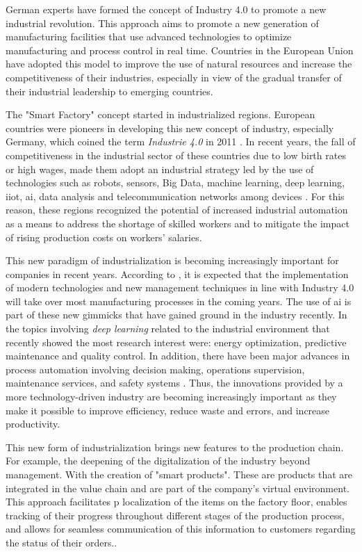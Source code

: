 German experts have formed the concept of Industry 4.0 to promote a new industrial revolution\cite{Grabowska+2020+90+96}. This approach aims to promote a new generation of manufacturing facilities that use advanced technologies to optimize manufacturing and process control in real time. Countries in the European Union have adopted this model to improve the use of natural resources and increase the competitiveness of their industries, especially in view of the gradual transfer of their industrial leadership to emerging countries.

The "Smart Factory" concept started in industrialized regions. European countries were pioneers in developing this new concept of industry, especially Germany, which coined the term \emph{Industrie 4.0} in 2011 \cite{Grabowska+2020+90+96}. In recent years, the fall of competitiveness in the industrial sector of these countries due to low birth rates or high wages, made them adopt an industrial strategy led by the use of technologies such as robots, sensors, Big Data, machine learning, deep learning, \acrfull{iiot}, \acrfull{ai}, data analysis and telecommunication networks among devices \cite{HerreroMeasuringTheEffectivenessOfIndustrialProcesses}. For this reason, these regions recognized the potential of increased industrial automation as a means to address the shortage of skilled workers and to mitigate the impact of rising production costs on workers' salaries.

This new paradigm of industrialization is becoming increasingly important for companies in recent years. According to \textcite{Grabowska+2020+90+96}, it is expected that the implementation of modern technologies and new management techniques in line with Industry 4.0 will take over most manufacturing processes in the coming years. The use of \acrshort{ai} is part of these new gimmicks that have gained ground in the industry recently. In \textcite{PeresIASmartFactory} the topics involving \emph{deep learning} related to the industrial environment that recently showed the most research interest were: energy optimization, predictive maintenance and quality control. In addition, there have been major advances in process automation involving decision making, operations supervision, maintenance services, and safety systems \cite{KUMAR2022121284}. Thus, the innovations provided by a more technology-driven industry are becoming increasingly important as they make it possible to improve efficiency, reduce waste and errors, and increase productivity.

This new form of industrialization brings new features to the production chain. For example, the deepening of the digitalization of the industry beyond management. With the creation of "smart products". These are products that are integrated in the value chain and are part of the company's virtual environment. This approach facilitates p localization of the items on the factory floor, enables tracking of their progress throughout different stages of the production process, and allows for seamless communication of this information to customers regarding the status of their orders.\cite{economies6030046}.

